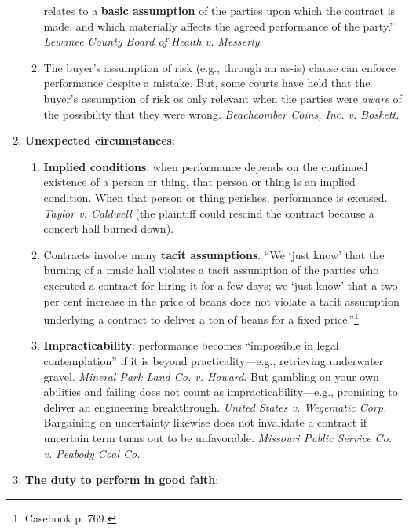 \begin{enumerate}
\begin{enumerate}
        relates to a \textbf{basic assumption} of the parties upon which the 
        contract is made, and which materially affects the agreed performance 
        of the party.'' \emph{Lewanee County Board of Health v. Messerly}.
        \item The buyer's assumption of risk (e.g., through an as-is) clause 
        can enforce performance despite a mistake. But, some courts have held 
        that the buyer's assumption of risk os only relevant when the parties 
        were \emph{aware} of the possibility that they were wrong. 
        \emph{Beachcomber Coins, Inc. v. Boskett.}
    \end{enumerate}
    \item \textbf{Unexpected circumstances}:
    \begin{enumerate}
        \item \textbf{Implied conditions}: when performance depends on the 
        continued existence of a person or thing, that person or thing is an 
        implied condition. When that person or thing perishes, performance is 
        excused. \emph{Taylor v. Caldwell} (the plaintiff could rescind the 
        contract because a concert hall burned down).
        \item Contracts involve many \textbf{tacit assumptions}.  \enquote{We 
        `just know' that the burning of a music hall violates a tacit 
        assumption of the parties who executed a contract for hiring it for a 
        few days; we `just know' that a two per cent increase in the price of 
        beans does not violate a tacit assumption underlying a contract to 
        deliver a ton of beans for a fixed price.}\footnote{Casebook p. 769.}
        \item \textbf{Impracticability}: performance becomes ``impossible in 
        legal contemplation'' if it is beyond practicality---e.g., retrieving 
        underwater gravel. \emph{Mineral Park Land Co. v. Howard}. But 
        gambling on your own abilities and failing does not count as 
        impracticability---e.g., promising to deliver an engineering 
        breakthrough. \emph{United States v. Wegematic Corp.} Bargaining on 
        uncertainty likewise does not invalidate a contract if uncertain term 
        turns out to be unfavorable. \emph{Missouri Public Service Co. v. 
        Peabody Coal Co.}
    \end{enumerate}
    \item \textbf{The duty to perform in good faith}:
    \begin{enumerate}

\end{enumerate}
\end{enumerate}
